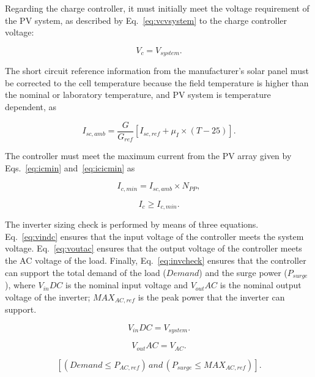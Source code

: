 \documentclass[journal]{IEEEtran}
\begin{document}
Regarding the charge controller, it must initially meet the voltage requirement of the PV system, as described by Eq.~\eqref{eq:vcvsystem} to the charge controller voltage: 

\begin{equation}
\label{eq:vcvsystem}
V_{c} = V_{system}.
\end{equation}

The short circuit reference information from the manufacturer's solar panel must be corrected 
to the cell temperature because the field temperature is higher than the nominal or laboratory temperature, and PV system is temperature dependent, as 

\begin{equation}
\label{eq:iscamb}
I_{sc,amb} = \dfrac{G}{G_{ref}} \left[ I_{sc,ref} + \mu_{I} \times (T-25) \right]. 
\end{equation}

The controller must meet the maximum current from the PV array given by Eqs.~\eqref{eq:icmin} and~\eqref{eq:icicmin} as

\begin{equation}
\label{eq:icmin}
I_{c,min} = I_{sc,amb} \times N_{PP},
\end{equation}

\begin{equation}
\label{eq:icicmin}
I_{c} \geq I_{c,min}.
\end{equation}

The inverter sizing check is performed by means of three equations. Eq.~\eqref{eq:vindc} ensures that 
the input voltage of the controller meets the system voltage. Eq.~\eqref{eq:voutac} ensures that the 
output voltage of the controller meets the AC voltage of the load. Finally, Eq.~\eqref{eq:invcheck} ensures that 
the controller can support the total demand of the load ($Demand$) and the surge power ($P_{surge}$), 
where $V_{in}DC$ is the nominal input voltage and $V_{out}AC$ is the nominal output voltage of the inverter; 
$MAX_{AC,ref}$ is the peak power that the inverter can support.

\begin{equation}
\label{eq:vindc} 
V_{in}DC = V_{system}.
\end{equation}

\begin{equation}
\label{eq:voutac} 
V_{out}AC = V_{AC}.
\end{equation}

\begin{equation}
\label{eq:invcheck} 
\left[ (Demand \leq P_{AC,ref}) \, and \, (P_{surge} \leq MAX_{AC,ref}) \right].
\end{equation}
\end{document}
